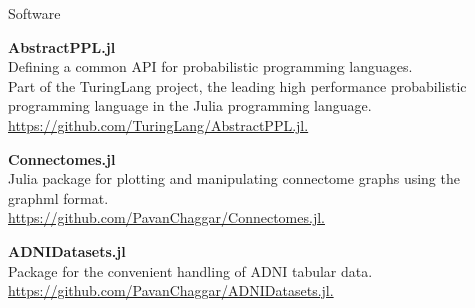 \begin{rSection}{Software}

{\bf AbstractPPL.jl} \\
Defining a common API for probabilistic programming languages. \\
Part of the TuringLang project, the leading high performance probabilistic programming language
in the Julia programming language. \\
\href{https://github.com/TuringLang/AbstractPPL.jl}{https://github.com/TuringLang/AbstractPPL.jl.}

{\bf Connectomes.jl} \\
Julia package for plotting and manipulating connectome graphs using the graphml format. \\
\href{https://github.com/PavanChaggar/Connectomes.jl}{https://github.com/PavanChaggar/Connectomes.jl.}

{\bf ADNIDatasets.jl} \\
Package for the convenient handling of ADNI tabular data. \\
\href{https://github.com/PavanChaggar/ADNIDatasets.jl}{https://github.com/PavanChaggar/ADNIDatasets.jl.}
\end{rSection}